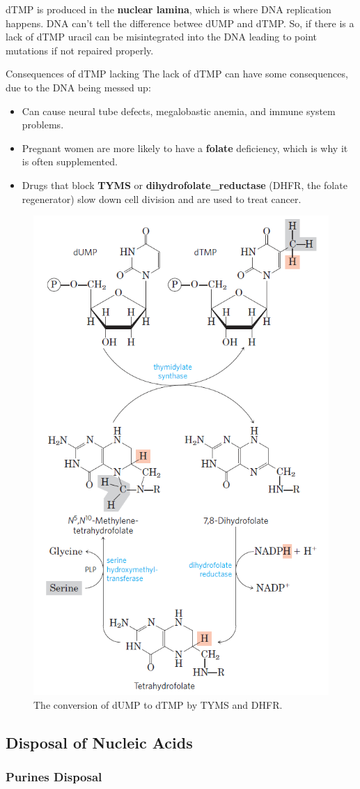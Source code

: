 \documentclass[../main.tex]{subfiles}
\begin{document}
dTMP is produced in the \textbf{nuclear lamina}, which is where DNA replication happens. DNA can't tell the difference betwee dUMP and dTMP. So, if there is a lack of dTMP uracil can be misintegrated into the DNA leading to point mutations if not repaired properly.

\begin{RemarkWithTitel}{Consequences of dTMP lacking} The lack of dTMP can have some consequences, due to the DNA being messed up: 
	\begin{itemize}
		\item Can cause neural tube defects, megalobastic anemia, and immune system problems.
		\item Pregnant women are more likely to have a \textbf{\gls{folate}} deficiency, which is why it is often supplemented.
		\item Drugs that block \textbf{TYMS} or \textbf{\gls{dihydrofolate_reductase}} (DHFR, the folate regenerator) slow down cell division and are used to treat cancer.
	\end{itemize} 
\end{RemarkWithTitel}
 
\begin{figure}[H]
	\centering
	\includegraphics[width=0.4\linewidth]{dTMP_path}
	\caption{The conversion of dUMP to dTMP by TYMS and DHFR.}
	\label{fig:dtmppath}
\end{figure}


\subsection{Disposal of Nucleic Acids}
\subsubsection{Purines Disposal}
\end{document}
